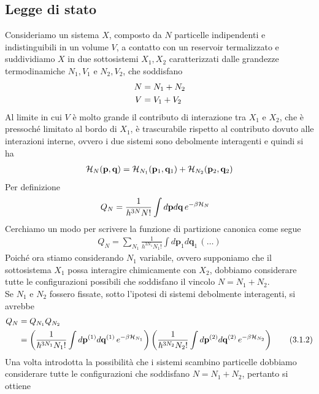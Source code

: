 \documentclass{article}
\begin{document}
\subsection{Legge di stato}
Consideriamo un sistema $X$, composto da $N$ particelle indipendenti e indistinguibili in un volume $V$, a contatto con un reservoir termalizzato e suddividiamo $X$ in due sottosistemi $X_1, X_2$ caratterizzati dalle grandezze termodinamiche $N_1, V_1$ e $N_2, V_2$, che soddisfano 
\begin{align}
    N &= N_1 + N_2 \notag \\
    V &= V_1 + V_2 \notag
\end{align}
Al limite in cui $V$ è molto grande il contributo di interazione tra $X_1$ e $X_2$, che è pressoché limitato al bordo di $X_1$, è trascurabile rispetto al contributo dovuto alle interazioni interne, ovvero i due sistemi sono debolmente interagenti e quindi si ha 
\begin{align}
    \mathcal{H}_N(\mathbf{p}, \mathbf{q}) = \mathcal{H}_{N_1}(\mathbf{p}_1, \mathbf{q}_1) + \mathcal{H}_{N_2}(\mathbf{p}_2, \mathbf{q}_2) \notag
\end{align}
Per definizione
\begin{align}
    Q_N &= \frac{1}{h^{3N}N!}\int d\mathbf{p}d\mathbf{q} \, e^{-\beta\mathcal{H}_N} \notag
\end{align}
Cerchiamo un modo per scrivere la funzione di partizione canonica come segue
\begin{align}
    Q_N = \sum_{N_1}\frac{1}{h^{3N_1}N_1!}\int d\mathbf{p}_1d\mathbf{q}_1 \, (\dots) \tag{3.1.1}
\end{align}
Poiché ora stiamo considerando $N_1$ variabile, ovvero supponiamo che il sottosistema $X_1$ possa interagire chimicamente con $X_2$, dobbiamo considerare tutte le configurazioni possibili che soddisfano il vincolo $N = N_1 + N_2$. \\
Se $N_1$ e $N_2$ fossero fissate, sotto l'ipotesi di sistemi debolmente interagenti, si avrebbe
\begin{align}
    Q_N &= Q_{N_1}Q_{N_2} \notag \\
    &= \left(\frac{1}{\hbar^{3N_1}N_1!}\int d\mathbf{p}^{(1)}d\mathbf{q}^{(1)} \, e^{-\beta\mathcal{H}_{N_1}}\right)\left(\frac{1}{\hbar^{3N_2}N_2!}\int d\mathbf{p}^{(2)}d\mathbf{q}^{(2)} \, e^{-\beta\mathcal{H}_{N_2}}\right) \tag{3.1.2}
\end{align}
Una volta introdotta la possibilità che i sistemi scambino particelle dobbiamo considerare tutte le configurazioni che soddisfano $N = N_1 + N_2$, pertanto si ottiene
\end{document}
